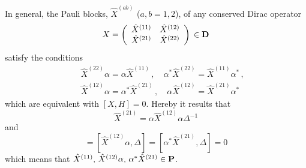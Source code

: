 \documentclass[a4paper,12pt]{article}
\begin{document}
In general, the Pauli blocks, $\hat X^{(ab)}$  ($a,b =1,2$), of any 
conserved Dirac operator
\begin{equation}\label{Xab}
X=\left(
\begin{array}{cc}
\hat X^{(11)}&\hat X^{(12)}\\
\hat X^{(21)}&\hat X^{(22)}
\end{array}\right)\,\in {\bf D}
\end{equation}
satisfy the conditions  
\begin{eqnarray}
&&\hat X^{(22)}\alpha= \alpha \hat X^{(11)}\,,\quad
\alpha^{*}\hat X^{(22)}=
\hat X^{(11)}\alpha^{*}\label{X1}\,, \\
&&\hat X^{(12)}\alpha= \alpha^{*} \hat X^{(21)}
\,,\quad 
\alpha \hat X^{(12)}=
\hat X^{(21)}\alpha^{*}\label{X2}
\end{eqnarray}
which are equivalent with $[X,H]=0$. Hereby it results that 
\begin{equation}
\hat X^{(21)}=\alpha \hat X^{(12)}\alpha \Delta^{-1}
\end{equation}
 and
\begin{equation}
[\hat X^{(11)},\Delta]=
[\hat X^{(12)}\alpha,\Delta]=
[\alpha^{*}\hat X^{(21)},\Delta]=0
\end{equation} 
which means that $\hat X^{(11)},\,\hat X^{(12)}\alpha,\,
\alpha^{*}\hat X^{(21)}\in {\bf P}$.
\end{document}
